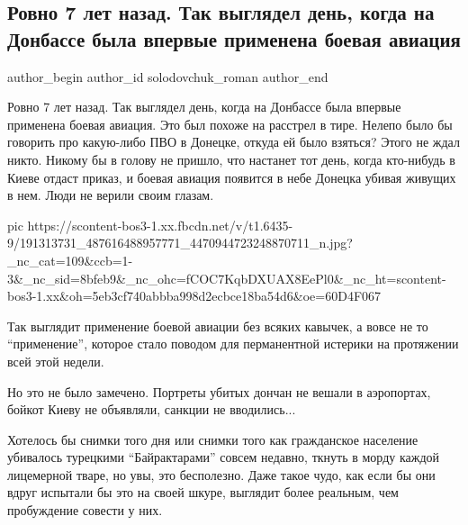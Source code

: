  
 
 
 
 
 
\subsection{Ровно 7 лет назад. Так выглядел день, когда на Донбассе была впервые применена боевая авиация}
\label{sec:27_05_2021.fb.solodovchuk_roman.1.aviacia_vojna_donbass}
\ifcmt
 author_begin
   author_id solodovchuk_roman
 author_end
\fi

Ровно 7 лет назад. Так выглядел день, когда на Донбассе была впервые применена
боевая авиация. Это был похоже на расстрел в тире. Нелепо было бы говорить про
какую-либо ПВО в Донецке, откуда ей было взяться? Этого не ждал никто. Никому
бы в голову не пришло, что настанет тот день, когда кто-нибудь в Киеве отдаст
приказ, и боевая авиация появится в небе Донецка убивая живущих в нем. Люди не
верили своим глазам. 


\ifcmt
  pic https://scontent-bos3-1.xx.fbcdn.net/v/t1.6435-9/191313731_487616488957771_4470944723248870711_n.jpg?_nc_cat=109&ccb=1-3&_nc_sid=8bfeb9&_nc_ohc=fCOC7KqbDXUAX8EePl0&_nc_ht=scontent-bos3-1.xx&oh=5eb3cf740abbba998d2ecbce18ba54d6&oe=60D4F067
\fi


Так выглядит применение боевой авиации без всяких кавычек, а вовсе не то
\enquote{применение}, которое стало поводом для перманентной истерики на протяжении
всей этой недели. 

Но это не было замечено. Портреты убитых дончан не вешали в аэропортах, бойкот
Киеву не объявляли, санкции не вводились... 

Хотелось бы снимки того дня или снимки того как гражданское население убивалось
турецкими \enquote{Байрактарами} совсем недавно, ткнуть в морду каждой лицемерной
тваре, но увы, это бесполезно. Даже такое чудо, как если бы они вдруг испытали
бы это на своей шкуре, выглядит более реальным, чем пробуждение совести у них.

